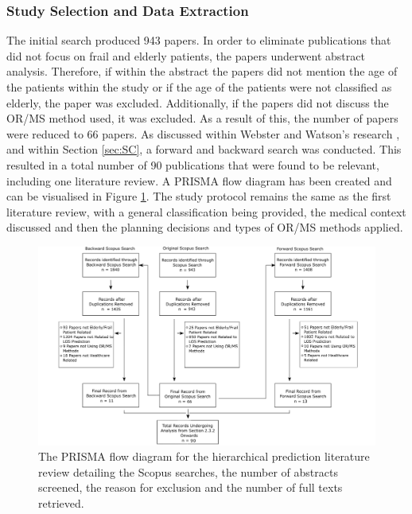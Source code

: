 \documentclass[../thesis.tex]{subfiles}
\begin{document}
\subsubsection{Study Selection and Data Extraction}
The initial search produced 943 papers. In order to eliminate publications that did not focus on frail and elderly patients, the papers underwent abstract analysis. Therefore, if within the abstract the papers did not mention the age of the patients within the study or if the age of the patients were not classified as elderly, the paper was excluded. Additionally, if the papers did not discuss the OR/MS method used, it was excluded. As a result of this, the number of papers were reduced to 66 papers. As discussed within Webster and Watson's research \cite{Webster}, and within Section \ref{sec:SC}, a forward and backward search was conducted. This resulted in a total number of 90 publications that were found to be relevant, including one literature review. A PRISMA flow diagram has been created and can be visualised in Figure \ref{appfig:SearchDiag2}. The study protocol remains the same as the first literature review, with a general classification being provided, the medical context discussed and then the planning decisions and types of OR/MS methods applied. 

\begin{landscape}
\begin{figure}
\centering
  \includegraphics[scale=0.5]{Chapters/Chapter2/Figures/FlowChart2Update.png}
 \caption{The PRISMA flow diagram for the hierarchical prediction literature review detailing the Scopus searches, the number of abstracts screened, the reason for exclusion and the number of full texts retrieved.}  
\label{appfig:SearchDiag2}
\end{figure}
\end{landscape}
\end{document}
